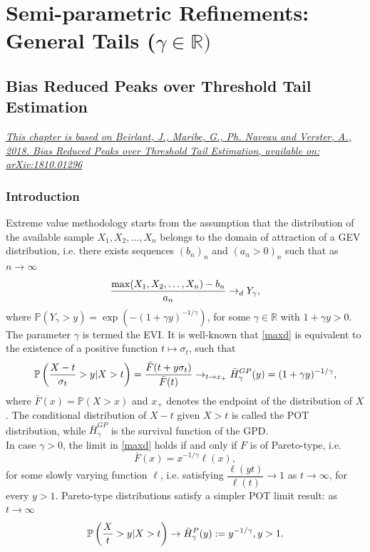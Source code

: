 \part{Semi-parametric Refinements: General Tails ($\gamma\in \mathbb{R})$}\label{part2}
\chapter{Bias Reduced Peaks over Threshold Tail Estimation}\label{chap5}
\href{https://arxiv.org/abs/1810.01296}{\textit{This chapter is based on Beirlant, J., Maribe, G., Ph. Naveau and Verster, A., 2018. Bias Reduced Peaks over Threshold Tail Estimation, available on: arXiv:1810.01296}}
\setcounter{equation}{0} 
\section{Introduction} 
\label{Sec1}       %
 Extreme value methodology starts from the assumption that the distribution of the available sample $X_1, X_2,\ldots,X_n$ belongs to the domain of attraction of a GEV distribution, i.e. there exists sequences $(b_n)_n$ and $(a_n>0)_n$ such that as $n \to \infty$
\begin{equation}
{\max (X_1, X_2,\ldots,X_n)-b_n \over a_n} \to _d Y_{\gamma},
\label{maxd}
\end{equation}
where $\mathbb{P} (Y_\gamma >y) = \exp (-(1+\gamma y)^{-1/\gamma})$, for some $\gamma \in \mathbb{R}$ with $1+\gamma y>0$. The parameter $\gamma$ is termed the EVI. It is well-known \citep[see e.g.][]{sts626,de2007extreme} that \eqref{maxd} is equivalent to the existence of a positive function $t \mapsto \sigma_t$, such that 
\begin{equation}
\mathbb{P}\left({X-t \over \sigma_t} >y| X>t \right)
= {\bar{F}(t+y\sigma_t) \over \bar{F}(t)} \to_{t \to x_+}
\bar{H}^{GP}_{\gamma}(y)= (1+\gamma y)^{-1/\gamma}, 
\label{POT}
\end{equation}
where $\bar{F}(x)=\mathbb{P}(X>x)$  and $x_+$ denotes the endpoint of the distribution of $X$. The conditional distribution of $X-t$ given $X>t$ is called the POT distribution, while $\bar{H}_{\gamma}^{GP}$ is the survival function of the GPD.\\
In case $\gamma >0$, the limit in \eqref{maxd} holds if and only if $F$ is of Pareto-type, i.e.
\begin{equation}
\bar{F}(x) = x^{-1/\gamma}\ell (x),
\label{Patype}
\end{equation} 
for some slowly varying function $\ell$, i.e. satisfying $\dfrac{\ell(yt)}{\ell (t)} \to 1 $ as $t \to \infty$, for every $y>1$. Pareto-type distributions satisfy a simpler POT limit result: as $t \to \infty$
\begin{equation}
\mathbb{P} \left( {X \over t} >y | X>t \right) \to \bar{H}^P_{\gamma}(y) := y^{-1/\gamma}, y>1. 
\label{POTPa}
\end{equation}

